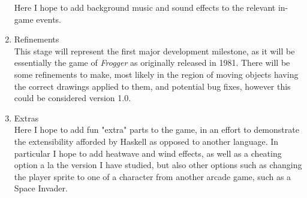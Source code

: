 \documentclass[12pt]{article}
\begin{document}
\begin{enumerate}
        Here I hope to add background music and sound effects to the relevant in-game events.
      \item Refinements\\
        This stage will represent the first major development milestone, as it will be essentially the game of \textit{Frogger} as originally released in 1981.
        There will be some refinements to make, most likely in the region of moving objects having the correct drawings applied to them, and potential bug fixes, however this could be considered version 1.0.
      \item Extras\\
        Here I hope to add fun "extra" parts to the game, in an effort to demonstrate the extensibility afforded by Haskell as opposed to another language.
        In particular I hope to add heatwave and wind effects, as well as a cheating option a la the version I have studied, but also other options such as changing the player sprite to one of a character from another arcade game, such as a Space Invader.
\end{enumerate}
\end{document}
